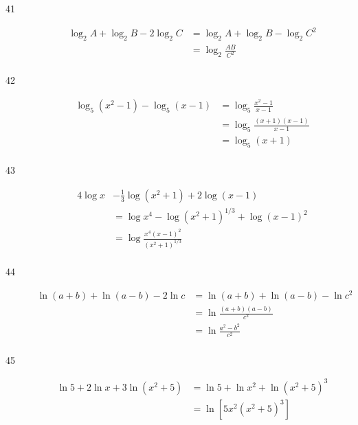 \documentclass{exam}
\begin{document}
\begin{description}
      \item[41] 
        \begin{align*}
          \log_2 A + \log_2 B - 2 \log_2 C &= \log_2 A + \log_2 B - \log_2 C^2 \\
                                           &= \boxed{\log_2 \frac{AB}{C^2}} \\
        \end{align*}

      \item[42] 
        \begin{align*}
          \log_5 (x^2 - 1) - \log_5 (x - 1) &= \log_5 \frac{x^2 - 1}{x - 1} \\
                                            &= \log_5 \frac{(x + 1)(x - 1)}{x - 1} \\
                                            &= \boxed{\log_5 (x + 1)} \\
        \end{align*}

      \item[43] 
        \begin{align*}
          4 \log x &- \frac{1}{3} \log (x^2 + 1) + 2 \log (x - 1) \\
                   &= \log x^4 - \log (x^2 + 1)^{1/3} + \log (x - 1)^2 \\
                   &= \boxed{\log \frac{x^4 (x - 1)^2}{(x^2 + 1)^{1/3}}} \\
        \end{align*}

      \item[44] 
        \begin{align*}
          \ln(a + b) + \ln(a - b) - 2 \ln c &= \ln(a + b) + \ln(a - b) - \ln c^2 \\
                                            &= \ln \frac{(a + b)(a - b)}{c^2} \\
                                            &= \boxed{\ln \frac{a^2 - b^2}{c^2}} \\
        \end{align*}

      \item[45] 
        \begin{align*}
          \ln 5 + 2 \ln x + 3 \ln (x^2 + 5) &= \ln 5 + \ln x^2 + \ln (x^2 + 5)^3 \\
                                            &= \boxed{\ln \left[ 5x^2 (x^2 + 5)^3 \right]} \\
        \end{align*}


\end{description}
\end{document}
